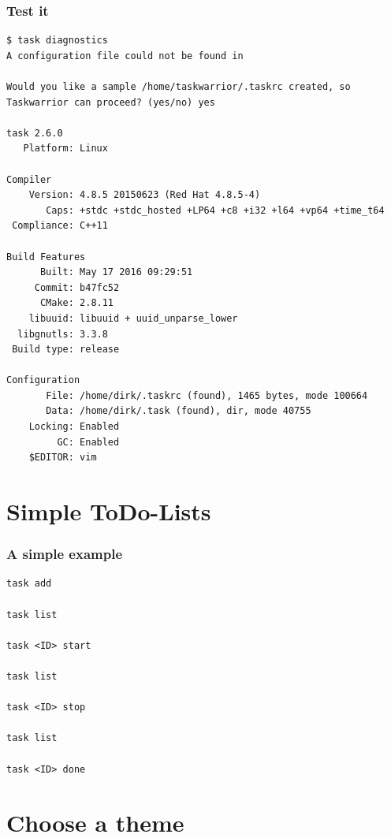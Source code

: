\documentclass[t,handout]{beamer}
\begin{document}
\begin{frame}[fragile]\frametitle{Test it}
    \vfill %
    \begin{lstlisting}
$ task diagnostics
A configuration file could not be found in

Would you like a sample /home/taskwarrior/.taskrc created, so Taskwarrior can proceed? (yes/no) yes

task 2.6.0
   Platform: Linux

Compiler
    Version: 4.8.5 20150623 (Red Hat 4.8.5-4)
       Caps: +stdc +stdc_hosted +LP64 +c8 +i32 +l64 +vp64 +time_t64
 Compliance: C++11

Build Features
      Built: May 17 2016 09:29:51
     Commit: b47fc52
      CMake: 2.8.11
    libuuid: libuuid + uuid_unparse_lower
  libgnutls: 3.3.8
 Build type: release

Configuration
       File: /home/dirk/.taskrc (found), 1465 bytes, mode 100664
       Data: /home/dirk/.task (found), dir, mode 40755
    Locking: Enabled
         GC: Enabled
    $EDITOR: vim\end{lstlisting}
\end{frame}


\section{Simple ToDo-Lists}

\begin{frame}[fragile]\frametitle{A simple example}
    \vfill
    \begin{lstlisting}
task add

task list

task <ID> start

task list

task <ID> stop

task list

task <ID> done\end{lstlisting}
\end{frame}

\section{Choose a theme}
\end{document}
